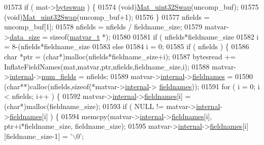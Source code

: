\begin{DoxyCode}
{{{{{{{{{{{01573         \textcolor{keywordflow}{if} ( mat->\hyperlink{struct__mat__t_a99d207977af5e04941ace56d71817a40}{byteswap} ) \{
01574             (void)\hyperlink{endian_8c_a8cb0d0750e2eaf9840d95db531934f4f}{Mat\_uint32Swap}(uncomp\_buf);
01575             (void)\hyperlink{endian_8c_a8cb0d0750e2eaf9840d95db531934f4f}{Mat\_uint32Swap}(uncomp\_buf+1);
01576         \}
01577         nfields = uncomp\_buf[1];
01578         nfields = nfields / fieldname\_size;
01579         matvar->\hyperlink{group___m_a_t_a9ad1c82e2b568da617e12dc73a26e1f9}{data\_size} = \textcolor{keyword}{sizeof}(\hyperlink{group___m_a_t_structmatvar__t}{matvar\_t} *);
01580 
01581         \textcolor{keywordflow}{if} ( nfields*fieldname\_size %
01582             i = 8-(nfields*fieldname\_size %
01583         \textcolor{keywordflow}{else}
01584             i = 0;
01585         \textcolor{keywordflow}{if} ( nfields ) \{
01586             \textcolor{keywordtype}{char} *ptr = (\textcolor{keywordtype}{char}*)malloc(nfields*fieldname\_size+i);
01587             bytesread += InflateFieldNames(mat,matvar,ptr,nfields,fieldname\_size,i);
01588             matvar->\hyperlink{group___m_a_t_a6e97e3ed9f40c49322c18561c2a94e92}{internal}->\hyperlink{structmatvar__internal_a93fc447484f455eddf9334f2e9e411c2}{num\_fields} = nfields;
01589             matvar->\hyperlink{group___m_a_t_a6e97e3ed9f40c49322c18561c2a94e92}{internal}->\hyperlink{structmatvar__internal_a7574d000bfc98ad4860ae6590b8d4985}{fieldnames} =
01590                 (\textcolor{keywordtype}{char}**)calloc(nfields,\textcolor{keyword}{sizeof}(*matvar->\hyperlink{group___m_a_t_a6e97e3ed9f40c49322c18561c2a94e92}{internal}->
      \hyperlink{structmatvar__internal_a7574d000bfc98ad4860ae6590b8d4985}{fieldnames}));
01591             \textcolor{keywordflow}{for} ( i = 0; i < nfields; i++ ) \{
01592                 matvar->\hyperlink{group___m_a_t_a6e97e3ed9f40c49322c18561c2a94e92}{internal}->\hyperlink{structmatvar__internal_a7574d000bfc98ad4860ae6590b8d4985}{fieldnames}[i] = (\textcolor{keywordtype}{char}*)malloc(fieldname\_size);
01593                 \textcolor{keywordflow}{if} ( NULL != matvar->\hyperlink{group___m_a_t_a6e97e3ed9f40c49322c18561c2a94e92}{internal}->\hyperlink{structmatvar__internal_a7574d000bfc98ad4860ae6590b8d4985}{fieldnames}[i] ) \{
01594                     memcpy(matvar->\hyperlink{group___m_a_t_a6e97e3ed9f40c49322c18561c2a94e92}{internal}->\hyperlink{structmatvar__internal_a7574d000bfc98ad4860ae6590b8d4985}{fieldnames}[i], ptr+i*fieldname\_size, 
      fieldname\_size);
01595                     matvar->\hyperlink{group___m_a_t_a6e97e3ed9f40c49322c18561c2a94e92}{internal}->\hyperlink{structmatvar__internal_a7574d000bfc98ad4860ae6590b8d4985}{fieldnames}[i][fieldname\_size-1] = \textcolor{charliteral}{'\(\backslash\)0'};
}}}}}}}}}}}
\end{DoxyCode}
